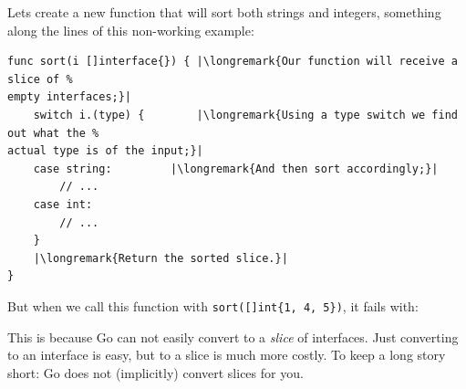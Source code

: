 Lets create a new function that will sort both strings and
integers, something along the lines of this non-working example:
\begin{lstlisting}
func sort(i []interface{}) { |\longremark{Our function will receive a slice of %
empty interfaces;}|
    switch i.(type) {        |\longremark{Using a type switch we find out what the %
actual type is of the input;}|
	case string:         |\longremark{And then sort accordingly;}|
	    // ...
	case int:
	    // ...
    }
    |\longremark{Return the sorted slice.}|
}
\end{lstlisting}
\showremarks
But when we call this function with \lstinline|sort([]int{1, 4, 5})|, it
fails with:

This is because Go can not easily convert to a \emph{slice} of interfaces.
Just converting to an interface is easy, but to a slice is much more costly.
To keep a 
long story short: Go does not (implicitly) convert slices for you.

